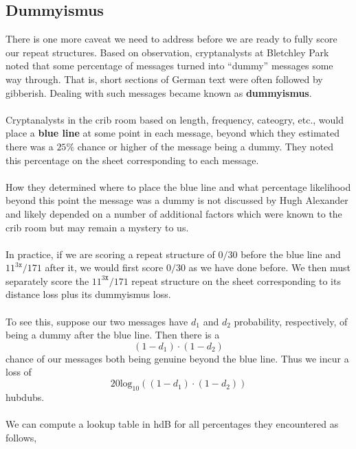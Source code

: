 \subsection{Dummyismus}
There is one more caveat we need to address before we are ready to
fully score our repeat structures. Based on observation,
cryptanalysts at Bletchley Park noted that some percentage of
messages turned into ``dummy'' messages some way through. That is,
short sections of German text were often followed by gibberish. Dealing with
such messages became known as {\bf{dummyismus}}.
\\\\Cryptanalysts in the crib room  based on length, frequency,
cateogry, etc., would place a {\bf{blue line}} at some point in
each message, beyond which they estimated there was a $25\%$ chance
or higher of the message being a dummy. They noted this
percentage on the sheet corresponding to each message.
\\\\How they determined where to place the blue line and what
percentage likelihood beyond this point the message was a dummy is
not discussed by Hugh Alexander and likely depended on a number of
additional factors which were known to the crib room but may remain
a mystery to us.
\\\\In practice, if we are scoring a repeat structure of $0/30$
before the blue line and $11^{3\texttt{x}}/171$ after it, we would
first score $0/30$ as we have done before. We then must separately score the
$11^{3\texttt{X}}/171$ repeat structure on the sheet corresponding to
its distance
loss plus its dummyismus loss.
\\\\To see this, suppose our two messages have $d_1$ and $d_2$
probability, respectively, of being a dummy after the blue line. Then there is a
\[
  (1-d_1)\cdot(1-d_2)
\]
chance of our messages both being genuine beyond the blue line. Thus
we incur a loss of
\[
  20\text{log}_{10}((1-d_1)\cdot(1-d_2))
\]
hubdubs.
\\\\We can compute a lookup table in hdB for all percentages they
encountered as follows,
